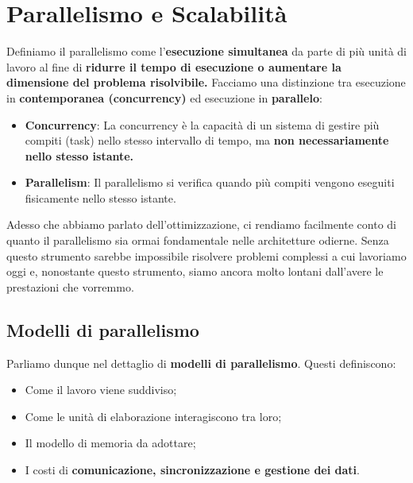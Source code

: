\chapter{Parallelismo e Scalabilità}
Definiamo il parallelismo come l'\textbf{esecuzione simultanea} da parte di più unità di lavoro al fine di \textbf{ridurre il tempo di esecuzione o aumentare la dimensione del problema risolvibile.}
Facciamo una distinzione tra esecuzione in \textbf{contemporanea (concurrency)} ed esecuzione in \textbf{parallelo}:
\begin{itemize}
    \item \textbf{Concurrency}: La concurrency è la capacità di un sistema di gestire più compiti (task) nello stesso intervallo di tempo, ma \textbf{non necessariamente nello stesso istante.}
    \item \textbf{Parallelism}: Il parallelismo si verifica quando più compiti vengono eseguiti fisicamente nello stesso istante.
\end{itemize}
Adesso che abbiamo parlato dell'ottimizzazione, ci rendiamo facilmente conto di quanto il parallelismo sia ormai fondamentale nelle architetture odierne. Senza questo strumento sarebbe impossibile risolvere problemi complessi a cui lavoriamo oggi e, nonostante questo strumento, siamo ancora molto lontani dall'avere le prestazioni che vorremmo. 
\section{Modelli di parallelismo}
Parliamo dunque nel dettaglio di \textbf{modelli di parallelismo}. Questi definiscono:
\begin{itemize}
    \item Come il lavoro viene suddiviso;
    \item Come le unità di elaborazione interagiscono tra loro;
    \item Il modello di memoria da adottare;
    \item I costi di \textbf{comunicazione, sincronizzazione e gestione dei dati}.
\end{itemize}

